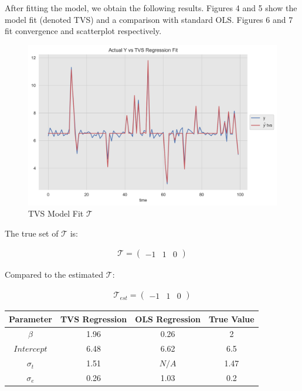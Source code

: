 \documentclass[11pt]{amsart}
\begin{document}
After fitting the model, we obtain the following results.
Figures 4 and 5 show the model fit (denoted TVS) and a comparison with standard OLS. Figures 6 and 7 fit convergence and scatterplot respectively.

\begin{center}
\begin{figure}
\includegraphics[totalheight=6cm]{images/tvs_fit.png}
\caption{TVS Model Fit $\mathcal{T}$}
\label{fig:verticalcell}
\end{figure}
\end{center}




The true set of $\mathcal{T}$ is:

\begin{align}
    \mathcal{T} = 
    \left(
    \begin{array}{ccc}
    -1 & 1 & 0 
    \end{array}  
    \right)
    \end{align}

Compared to the estimated $\mathcal{T}$:

\begin{align}
    \mathcal{T}_{est} = 
    \left(
    \begin{array}{ccc}
    -1 & 1 & 0 
    \end{array}  
    \right)
    \end{align}



\begin{tabular}{c|c|c|c|}
\hline
Parameter & TVS Regression & OLS Regression & True Value \\
\hline
$\beta$ & 1.96 & 0.26 & 2  \\
\hline
$Intercept$ & 6.48 & 6.62 & 6.5 \\
\hline
$\sigma_t$ & 1.51 & $N/A$ & 1.47 \\
\hline
$\sigma_e$ & 0.26 & 1.03 & 0.2 \\
\end{tabular}
\end{document}

